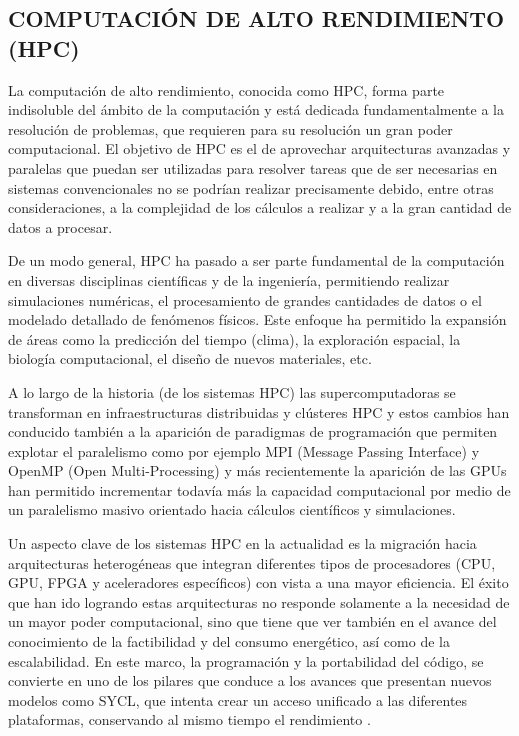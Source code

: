 \documentclass[12pt]{article}
\begin{document}
\subsection{COMPUTACIÓN DE ALTO RENDIMIENTO (HPC)}

La computación de alto rendimiento, conocida como HPC, forma parte indisoluble del ámbito de la computación y está dedicada fundamentalmente a la resolución de problemas, que requieren para su resolución un gran poder computacional. El objetivo de HPC es el de aprovechar arquitecturas avanzadas y paralelas que puedan ser utilizadas para resolver tareas que de ser necesarias en sistemas convencionales no se podrían realizar precisamente debido, entre otras consideraciones, a la complejidad de los cálculos a realizar y a la gran cantidad de datos a procesar. \cite{eijkhout_art_2022}


De un modo general, HPC ha pasado a ser parte fundamental de la computación en diversas disciplinas científicas y de la ingeniería, permitiendo realizar simulaciones numéricas, el procesamiento de grandes cantidades de datos o el modelado detallado de fenómenos físicos. Este enfoque ha permitido la expansión de áreas como la predicción del tiempo (clima), la exploración espacial, la biología computacional, el diseño de nuevos materiales, etc.


A lo largo de la historia (de los sistemas HPC) las supercomputadoras se transforman en infraestructuras distribuidas y clústeres HPC y estos cambios han conducido también a la aparición de paradigmas de programación que permiten explotar el paralelismo como por ejemplo MPI (Message Passing Interface) y OpenMP (Open Multi-Processing) y más recientemente la aparición de las GPUs han permitido incrementar todavía más la capacidad computacional por medio de un paralelismo masivo orientado hacia cálculos científicos y simulaciones.\cite{eijkhout_art_2022}


Un aspecto clave de los sistemas HPC en la actualidad es la migración hacia arquitecturas heterogéneas que integran diferentes tipos de procesadores (CPU, GPU, FPGA y aceleradores específicos) con vista a una mayor eficiencia. El éxito que han ido logrando estas arquitecturas no responde solamente a la necesidad de un mayor poder computacional, sino que tiene que ver también en el avance del conocimiento de la factibilidad y del consumo energético, así como de la escalabilidad. En este marco, la programación y la portabilidad del código, se convierte en uno de los pilares que conduce a los avances que presentan nuevos modelos como SYCL, que intenta crear un acceso unificado a las diferentes plataformas, conservando al mismo tiempo el rendimiento \cite{reinders_data_2021} .
\end{document}
